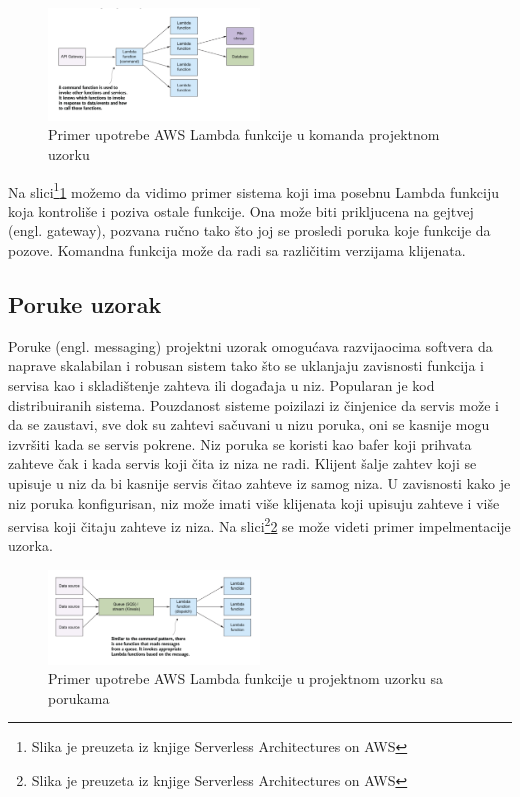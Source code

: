 \documentclass[12pt,oneside]{memoir}
\begin{document}
\begin{figure}[!ht]
  \centering
  \includegraphics[width=0.5\textwidth]{Slika 12.png}
  \caption{Primer upotrebe AWS Lambda funkcije u komanda projektnom uzorku}
  \label{fig:komanda}
\end{figure}
 
Na slici\footnote{Slika je preuzeta iz knjige Serverless Architectures on AWS}\ref{fig:komanda} možemo da vidimo primer sistema koji ima posebnu Lambda funkciju koja kontroliše i poziva ostale funkcije. Ona može biti prikljucena na gejtvej (engl. gateway), pozvana ručno tako što joj se prosledi poruka koje funkcije da pozove. Komandna funkcija može da radi sa različitim verzijama klijenata.

\subsection{Poruke uzorak} %

Poruke (engl. messaging) projektni uzorak omogućava razvijaocima softvera da naprave skalabilan i robusan sistem tako što se uklanjaju zavisnosti funkcija i servisa kao i skladištenje zahteva ili događaja u niz. Popularan je kod distribuiranih sistema\cite{sa}. Pouzdanost sisteme poizilazi iz činjenice da servis može i da se zaustavi, sve dok su zahtevi sačuvani u nizu poruka, oni se kasnije mogu izvršiti kada se servis pokrene. Niz poruka se koristi kao bafer koji prihvata zahteve čak i kada servis koji čita iz niza ne radi. Klijent šalje zahtev koji se upisuje u niz da bi kasnije servis čitao zahteve iz samog niza. U zavisnosti kako je niz poruka konfigurisan, niz može imati više klijenata koji upisuju zahteve i više servisa koji čitaju zahteve iz niza. Na slici\footnote{Slika je preuzeta iz knjige Serverless Architectures on AWS}\ref{fig:poruke} se može videti primer impelmentacije uzorka.

\begin{figure}[!ht]
  \centering
  \includegraphics[width=0.5\textwidth]{Slika 13.png}
  \caption{Primer upotrebe AWS Lambda funkcije u projektnom uzorku sa porukama}
  \label{fig:poruke}
\end{figure}
 
\end{document}
